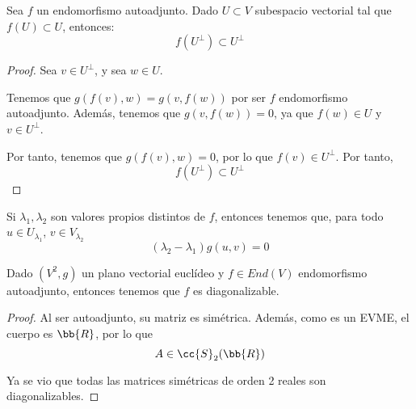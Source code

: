 \begin{comment}
\begin{prop}
    Sea $f\in End(V^n, g)$ un endomorfismo autoadjunto. Entonces:
    \begin{equation*}
        Im(f)\oplus Ker(f) = V
    \end{equation*}
\end{prop}
\begin{proof}
    En primer lugar, es trivial ver que $Im(f)\cap Ker(f)=\{0\}$. Veamos ahora que $Im(f)+Ker(f)=V$:
\end{proof}
\end{comment}

\begin{prop}
    Sea $f$ un endomorfismo autoadjunto. Dado $U\subset V$ subespacio vectorial tal que $f(U)\subset U$, entonces:
    \begin{equation*}
        f(U^\perp)\subset U^\perp
    \end{equation*}
\end{prop}
\begin{proof}
    Sea $v\in U^\perp$, y sea $w\in U$.

    Tenemos que $g(f(v),w)=g(v, f(w))$ por ser $f$ endomorfismo autoadjunto. Además, tenemos que $g(v,f(w))=0$, ya que $f(w)\in U$ y $v\in U^\perp$.

    Por tanto, tenemos que $g(f(v), w)=0$, por lo que $f(v)\in U^\perp$. Por tanto, $$f(U^\perp)\subset U^\perp$$
\end{proof}

\begin{coro}
    Si $\lambda_1, \lambda_2$ son valores propios distintos de $f$, entonces tenemos que, para todo $u\in U_{\lambda_1}$, $v\in V_{\lambda_2}$
    \begin{equation*}
        (\lambda_2 - \lambda_1)g(u,v)=0
    \end{equation*}
\end{coro}

\begin{lema}
    Dado $(V^2, g)$ un plano vectorial euclídeo y $f\in End(V)$ endomorfismo autoadjunto, entonces tenemos que $f$ es diagonalizable.
\end{lema}
\begin{proof}
    Al ser autoadjunto, su matriz es simétrica. Además, como es un EVME, el cuerpo es $\bb{R}$, por lo que
    $$A\in \cc{S}_2(\bb{R})$$
    
    Ya se vio que todas las matrices simétricas de orden 2 reales son diagonalizables.
\end{proof}

